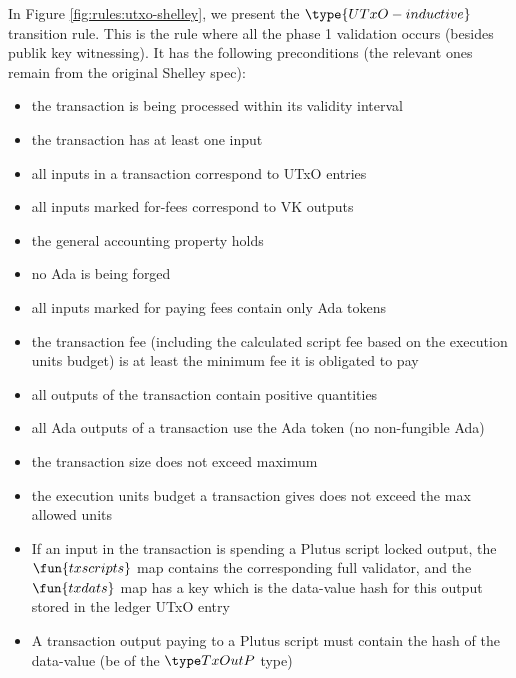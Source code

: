 In Figure \ref{fig:rules:utxo-shelley}, we present the $\type{UTxO-inductive}$
transition rule. This is the rule where all the phase 1 validation occurs
(besides publik key witnessing).
It has the following preconditions (the relevant ones remain
from the original Shelley spec):

\begin{itemize}
  \item the transaction is being processed within its validity interval

  \item the transaction has at least one input

  \item all inputs in a transaction correspond to UTxO entries

  \item all inputs marked for-fees correspond to VK outputs

  \item the general accounting property holds

  \item no Ada is being forged

  \item all inputs marked for paying fees contain only Ada tokens

  \item the transaction fee (including the calculated script fee
  based on the execution units budget) is at least the minimum fee it is obligated to pay

  \item all outputs of the transaction contain positive quantities

  \item all Ada outputs of a transaction use the Ada token (no non-fungible Ada)

  \item the transaction size does not exceed maximum

  \item the execution units budget a transaction gives does not exceed the max
  allowed units

  \item If an input in the transaction is spending a Plutus script locked output,
  the $\fun{txscripts}$ map contains the corresponding full validator, and the
  $\fun{txdats}$ map has a key which is the
  data-value hash for this output stored in the ledger UTxO entry

  \item A transaction output paying to a Plutus script must
  contain the hash of the data-value (be of the $\TxOutP$ type)


\end{itemize}
